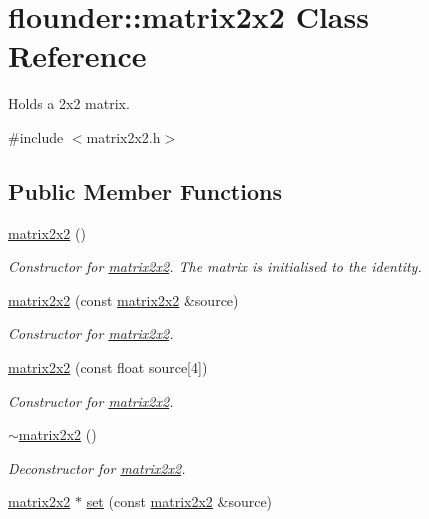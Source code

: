 \hypertarget{classflounder_1_1matrix2x2}{}\section{flounder\+:\+:matrix2x2 Class Reference}
\label{classflounder_1_1matrix2x2}


Holds a 2x2 matrix.  




{\ttfamily \#include $<$matrix2x2.\+h$>$}

\subsection*{Public Member Functions}
\begin{DoxyCompactItemize}
\item 
\hyperlink{classflounder_1_1matrix2x2_a36cfba47f3343e46a6718fb2114a31ad}{matrix2x2} ()
\begin{DoxyCompactList}\small\item\em Constructor for \hyperlink{classflounder_1_1matrix2x2}{matrix2x2}. The matrix is initialised to the identity. \end{DoxyCompactList}\item 
\hyperlink{classflounder_1_1matrix2x2_aed6637e2cdad9192621cae7a2e7b4ba2}{matrix2x2} (const \hyperlink{classflounder_1_1matrix2x2}{matrix2x2} \&source)
\begin{DoxyCompactList}\small\item\em Constructor for \hyperlink{classflounder_1_1matrix2x2}{matrix2x2}. \end{DoxyCompactList}\item 
\hyperlink{classflounder_1_1matrix2x2_a4b45919974b7aa8c771b4077b9a8017e}{matrix2x2} (const float source\mbox{[}4\mbox{]})
\begin{DoxyCompactList}\small\item\em Constructor for \hyperlink{classflounder_1_1matrix2x2}{matrix2x2}. \end{DoxyCompactList}\item 
\hyperlink{classflounder_1_1matrix2x2_a8bbacd384a0e30207d45f1e5f20c50fc}{$\sim$matrix2x2} ()
\begin{DoxyCompactList}\small\item\em Deconstructor for \hyperlink{classflounder_1_1matrix2x2}{matrix2x2}. \end{DoxyCompactList}\item 
\hyperlink{classflounder_1_1matrix2x2}{matrix2x2} $\ast$ \hyperlink{classflounder_1_1matrix2x2_a24b8f0c7bcec9e95b5c594f51e9ecfd2}{set} (const \hyperlink{classflounder_1_1matrix2x2}{matrix2x2} \&source)

\end{DoxyCompactItemize}
